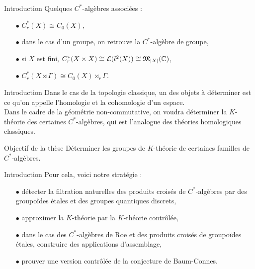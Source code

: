 \begin{frame}{Introduction}
Quelques $C^*$-algèbres associées :
\vspace{0.3 cm}
\begin{itemize}
\item[$\bullet$] $C_r^*(X)\cong C_0(X)$,
\vspace{0.3 cm}
\item[$\bullet$] dans le cas d'un groupe, on retrouve la $C^*$-algèbre de groupe,
\vspace{0.3 cm}
\item[$\bullet$] si $X$ est fini, $C^*_r(X\times X) \cong \mathcal L (l^2(X)) \cong \mathfrak M_{|X|}(\mathbb C)$,
\vspace{0.3 cm}
\item[$\bullet$] $C^*_r(X\rtimes \Gamma) \cong C_0(X)\rtimes_r \Gamma$.
\end{itemize}
\end{frame}

\begin{frame}{Introduction}
Dans le cas de la topologie classique, un des objets à déterminer est ce qu'on appelle l'homologie et la cohomologie d'un espace.\\
\vspace{0.3 cm}
Dans le cadre de la géométrie non-commutative, on voudra déterminer la $K$-théorie des certaines $C^*$-algèbres, qui est l'analogue des théories homologiques classiques. 
\vspace{0.3 cm}
\begin{block}{Objectif de la thèse}
Déterminer les groupes de $K$-théorie de certaines familles de $C^*$-algèbres.
\end{block}
\end{frame}

\begin{frame}{Introduction}
Pour cela, voici notre stratégie :\\
\vspace{0.3 cm}
\begin{itemize}
\item[$\bullet$] détecter la filtration naturelles des produits croisés de $C^*$-algèbres par des groupoîdes étales et des groupes quantiques discrets,
\vspace{0.3 cm}
\item[$\bullet$] approximer la $K$-théorie par la $K$-théorie contrôlée,
\vspace{0.3 cm}
\item[$\bullet$] dans le cas des $C^*$-algèbres de Roe et des produits croisés de groupoïdes étales, construire des applications d'assemblage,
\vspace{0.3 cm}
\item[$\bullet$] prouver une version contrôlée de la conjecture de Baum-Connes.
\end{itemize}
\end{frame}
